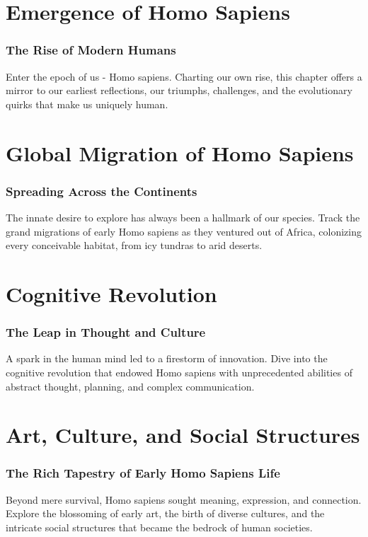\documentclass[a4paper,12pt]{book}
\begin{document}
\chapter{Emergence of Homo Sapiens}
\subsection*{The Rise of Modern Humans}
Enter the epoch of us - Homo sapiens. Charting our own rise, this chapter offers a mirror to our earliest reflections, our triumphs, challenges, and the evolutionary quirks that make us uniquely human.

\chapter{Global Migration of Homo Sapiens}
\subsection*{Spreading Across the Continents}
The innate desire to explore has always been a hallmark of our species. Track the grand migrations of early Homo sapiens as they ventured out of Africa, colonizing every conceivable habitat, from icy tundras to arid deserts.

\chapter{Cognitive Revolution}
\subsection*{The Leap in Thought and Culture}
A spark in the human mind led to a firestorm of innovation. Dive into the cognitive revolution that endowed Homo sapiens with unprecedented abilities of abstract thought, planning, and complex communication.

\chapter{Art, Culture, and Social Structures}
\subsection*{The Rich Tapestry of Early Homo Sapiens Life}
Beyond mere survival, Homo sapiens sought meaning, expression, and connection. Explore the blossoming of early art, the birth of diverse cultures, and the intricate social structures that became the bedrock of human societies.
\end{document}
